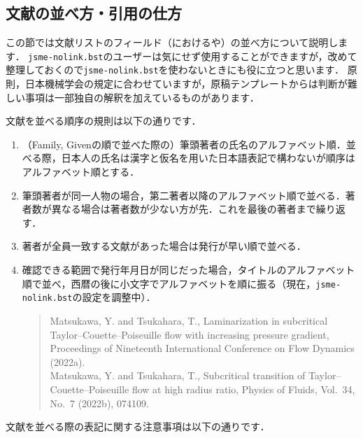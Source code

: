 \documentclass[a4paper,fleqn,uplatex,dvipdfmx]{jsarticle}
\newcommand{\jsmefile}{\texttt{jsme-nolink.bst}}
\begin{document}
\subsection{文献の並べ方・引用の仕方}
この節では文献リストのフィールド（\BibTeX{}における\ttauthor や\tttitle）の並べ方について説明します．
\jsmefile のユーザーは気にせず使用することができますが，改めて整理しておくので\jsmefile を使わないときにも役に立つと思います．
原則，日本機械学会の規定に合わせていますが，原稿テンプレートからは判断が難しい事項は一部独自の解釈を加えているものがあります．

文献を並べる順序の規則は以下の通りです．
\begin{tcolorbox}[enhanced, title=\textgt{文献ソート規則}, drop fuzzy shadow]
    \begin{enumerate}
        \item （Family, Givenの順で並べた際の）筆頭著者の氏名のアルファベット順．並べる際，日本人の氏名は漢字と仮名を用いた日本語表記で構わないが順序はアルファベット順とする．
        \item 筆頭著者が同一人物の場合，第二著者以降のアルファベット順で並べる．著者数が異なる場合は著者数が少ない方が先．これを最後の著者まで繰り返す．
        \item 著者が全員一致する文献があった場合は発行が早い順で並べる．
        \item 確認できる範囲で発行年月日が同じだった場合，タイトルのアルファベット順で並べ，西暦の後に小文字でアルファベットを順に振る（現在，\jsmefile の設定を調整中）．
        \begin{quote}
            Matsukawa, Y. and Tsukahara, T., Laminarization in subcritical Taylor--Couette--Poiseuille flow with increasing pressure gradient, Proceedings of Nineteenth International Conference on Flow Dynamics (2022a). \\
            Matsukawa, Y. and Tsukahara, T., Subcritical transition of Taylor--Couette--Poiseuille flow at high radius ratio, Physics of Fluids, Vol.~34, No.~7 (2022b), 074109.
        \end{quote}
    \end{enumerate}
\end{tcolorbox}
\noindent
文献を並べる際の表記に関する注意事項は以下の通りです．
\renewcommand\UrlFont{\rmfamily}
\end{document}
